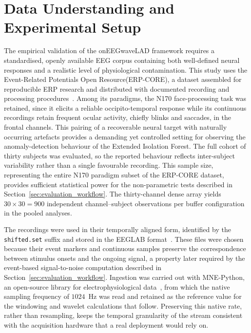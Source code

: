 \documentclass[MScCS,12pt,oneside,final]{uccthesis}
\begin{document}
\section{Data Understanding and Experimental Setup}
 
The empirical validation of the onEEGwaveLAD framework requires a standardised, openly available EEG corpus containing both well-defined neural responses and a realistic level of physiological contamination. This study uses the Event-Related Potentials Open Resource(ERP-CORE), a dataset assembled for reproducible ERP research and distributed with documented recording and processing procedures~\parencite{kappenman2021erp}. Among its paradigms, the N170 face-processing task was retained, since it elicits a reliable occipito-temporal response while its continuous recordings retain frequent ocular activity, chiefly blinks and saccades, in the frontal channels. This pairing of a recoverable neural target with naturally occurring artefacts provides a demanding yet controlled setting for observing the anomaly-detection behaviour of the Extended Isolation Forest. The full cohort of thirty subjects was evaluated, so the reported behaviour reflects inter-subject variability rather than a single favourable recording. This sample size, representing the entire N170 paradigm subset of the ERP-CORE dataset, provides sufficient statistical power for the non-parametric tests described in Section~\ref{sec:evaluation_workflow}. The thirty-channel dense array yields $30 \times 30 = 900$ independent channel--subject observations per buffer configuration in the pooled analyses.
 
The recordings were used in their temporally aligned form, identified by the \texttt{shifted\allowbreak .set} suffix and stored in the EEGLAB format~\parencite{delorme2004eeglab}. These files were chosen because their event markers and continuous samples preserve the correspondence between stimulus onsets and the ongoing signal, a property later required by the event-based signal-to-noise computation described in Section~\ref{sec:evaluation_workflow}. Ingestion was carried out with MNE-Python, an open-source library for electrophysiological data~\parencite{gramfort2013meg}, from which the native sampling frequency of $1024$~Hz was read and retained as the reference value for the windowing and wavelet calculations that follow. Preserving this native rate, rather than resampling, keeps the temporal granularity of the stream consistent with the acquisition hardware that a real deployment would rely on.
 
\end{document}
